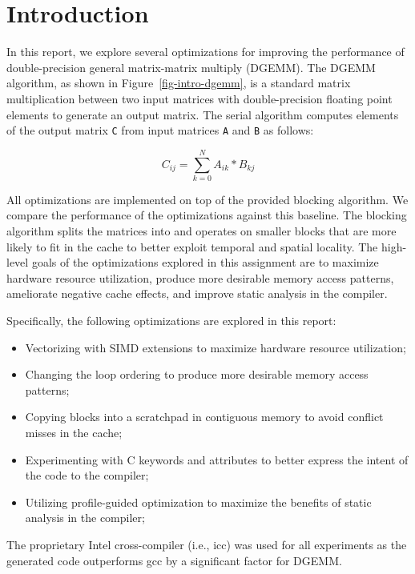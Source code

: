 
\section{Introduction}
\label{sec-intro}



In this report, we explore several optimizations for improving the
performance of double-precision general matrix-matrix multiply
(DGEMM). The DGEMM algorithm, as shown in Figure~\ref{fig-intro-dgemm},
is a standard matrix multiplication between two input matrices with
double-precision floating point elements to generate an output
matrix. The serial algorithm computes elements of the output matrix
{\tt{C}} from input matrices {\tt{A}} and {\tt{B}} as follows:

\[
C_{ij} = \sum_{k=0}^{N}A_{ik}*B_{kj}
\]
\smallskip

All optimizations are implemented on top of the provided blocking
algorithm. We compare the performance of the optimizations against this
baseline. The blocking algorithm splits the matrices into and operates on
smaller blocks that are more likely to fit in the cache to better exploit
temporal and spatial locality. The high-level goals of the optimizations
explored in this assignment are to maximize hardware resource
utilization, produce more desirable memory access patterns, ameliorate
negative cache effects, and improve static analysis in the compiler.

Specifically, the following optimizations are explored in this report:

\begin{itemize}
  \item Vectorizing with SIMD extensions to maximize hardware resource
    utilization;
  \item Changing the loop ordering to produce more desirable memory
    access patterns;
  \item Copying blocks into a scratchpad in contiguous memory to
    avoid conflict misses in the cache;
  \item Experimenting with C keywords and attributes to better express
    the intent of the code to the compiler;
  \item Utilizing profile-guided optimization to maximize the benefits of
    static analysis in the compiler;
\end{itemize}
\smallskip

The proprietary Intel cross-compiler (i.e., icc) was used for all
experiments as the generated code outperforms gcc by a significant factor
for DGEMM.

\clearpage
